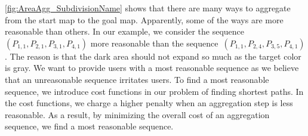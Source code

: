 \documentclass[acmsmall,natbib=false]{acmart}
\begin{document}
\fig\ref{fig:AreaAgg_SubdivisionName} shows that there are many 
ways to aggregate from the start map to the goal map.
Apparently, some of the ways are more reasonable than 
others.
In our example, we consider 
the sequence~$(P_{1,1}, P_{2,1},P_{3,1},P_{4,1})$ 
more reasonable than 
the sequence~$(P_{1,1}, P_{2,4},P_{3,5},P_{4,1})$.
The reason is that the dark area should not expand so much
as the target color is gray.
We want to provide users with a most reasonable sequence as we 
believe that an unreasonable sequence irritates users.
To find a most reasonable sequence, we introduce cost functions 
in our problem of finding shortest paths.
In the cost functions, we charge a higher penalty 
when an aggregation step is less reasonable.
As a result, by minimizing the overall cost of an aggregation 
sequence, we find a most reasonable sequence.
\end{document}
